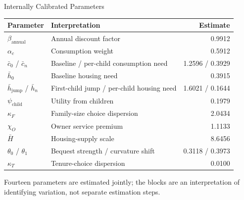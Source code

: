 \documentclass[aspectratio=169,11pt]{beamer}
\newcommand{\1}{\mathbf 1}
\begin{document}
\begin{frame}{Internally Calibrated Parameters}
  \scriptsize
  \renewcommand{\arraystretch}{0.92}
  \centering
  \begin{tabular}{@{}llr@{}}
    \toprule
    Parameter & Interpretation & Estimate \\
    \midrule
    $\beta_{\mathrm{annual}}$ & Annual discount factor & 0.9912 \\
    $\alpha_c$ & Consumption weight & 0.5912 \\
    $\bar c_0$ / $\bar c_n$ & Baseline / per-child consumption need & 1.2596 / 0.3929 \\
    $\bar h_0$ & Baseline housing need & 0.3915 \\
    $\bar h_{\mathrm{jump}}$ / $\bar h_n$ & First-child jump / per-child housing need & 1.6021 / 0.1644 \\
    $\psi_{\mathrm{child}}$ & Utility from children & 0.1979 \\
    $\kappa_F$ & Family-size choice dispersion & 2.0434 \\
    $\chi_O$ & Owner service premium & 1.1133 \\
    $\bar H$ & Housing-supply scale & 8.6456 \\
    $\theta_0$ / $\theta_1$ & Bequest strength / curvature shift & 0.3118 / 0.3973 \\
    $\kappa_T$ & Tenure-choice dispersion & 0.0100 \\
    \bottomrule
  \end{tabular}

  \vfill
  Fourteen parameters are estimated jointly; the blocks are an interpretation of identifying variation, not separate estimation steps.
\end{frame}
\end{document}
